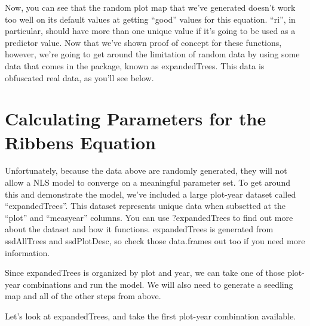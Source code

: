 \documentclass{report}
\begin{document}
Now, you can see that the random plot map that we've generated doesn't work too well on its default values at getting ``good'' values for this equation. ``ri'', in particular, should have more than one unique value if it's going to be used as a predictor value. Now that we've shown proof of concept for these functions, however, we're going to get around the limitation of random data by using some data that comes in the package, known as expandedTrees. This data is obfuscated real data, as you'll see below.

\section{Calculating Parameters for the Ribbens Equation}

Unfortunately, because the data above are randomly generated, they will not allow a NLS model to converge on a meaningful parameter set. To get around this and demonstrate the model, we've included a large plot-year dataset called ``expandedTrees''.  This dataset represents unique data when subsetted at the ``plot'' and ``measyear'' columns. You can use ?expandedTrees to find out more about the dataset and how it functions. expandedTrees is generated from ssdAllTrees and ssdPlotDesc, so check those data.frames out too if you need more information.

Since expandedTrees is organized by plot and year, we can take one of those plot-year combinations and run the model. We will also need to generate a seedling map and all of the other steps from above.

Let's look at expandedTrees, and take the first plot-year combination available.
\end{document}
